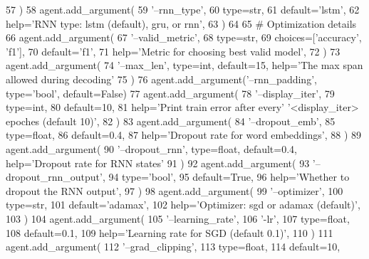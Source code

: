 \begin{DoxyCode}
57     )
58     agent.add\_argument(
59         \textcolor{stringliteral}{'--rnn\_type'},
60         type=str,
61         default=\textcolor{stringliteral}{'lstm'},
62         help=\textcolor{stringliteral}{'RNN type: lstm (default), gru, or rnn'},
63     )
64 
65     \textcolor{comment}{# Optimization details}
66     agent.add\_argument(
67         \textcolor{stringliteral}{'--valid\_metric'},
68         type=str,
69         choices=[\textcolor{stringliteral}{'accuracy'}, \textcolor{stringliteral}{'f1'}],
70         default=\textcolor{stringliteral}{'f1'},
71         help=\textcolor{stringliteral}{'Metric for choosing best valid model'},
72     )
73     agent.add\_argument(
74         \textcolor{stringliteral}{'--max\_len'}, type=int, default=15, help=\textcolor{stringliteral}{'The max span allowed during decoding'}
75     )
76     agent.add\_argument(\textcolor{stringliteral}{'--rnn\_padding'}, type=\textcolor{stringliteral}{'bool'}, default=\textcolor{keyword}{False})
77     agent.add\_argument(
78         \textcolor{stringliteral}{'--display\_iter'},
79         type=int,
80         default=10,
81         help=\textcolor{stringliteral}{'Print train error after every'} \textcolor{stringliteral}{'<display\_iter> epoches (default 10)'},
82     )
83     agent.add\_argument(
84         \textcolor{stringliteral}{'--dropout\_emb'},
85         type=float,
86         default=0.4,
87         help=\textcolor{stringliteral}{'Dropout rate for word embeddings'},
88     )
89     agent.add\_argument(
90         \textcolor{stringliteral}{'--dropout\_rnn'}, type=float, default=0.4, help=\textcolor{stringliteral}{'Dropout rate for RNN states'}
91     )
92     agent.add\_argument(
93         \textcolor{stringliteral}{'--dropout\_rnn\_output'},
94         type=\textcolor{stringliteral}{'bool'},
95         default=\textcolor{keyword}{True},
96         help=\textcolor{stringliteral}{'Whether to dropout the RNN output'},
97     )
98     agent.add\_argument(
99         \textcolor{stringliteral}{'--optimizer'},
100         type=str,
101         default=\textcolor{stringliteral}{'adamax'},
102         help=\textcolor{stringliteral}{'Optimizer: sgd or adamax (default)'},
103     )
104     agent.add\_argument(
105         \textcolor{stringliteral}{'--learning\_rate'},
106         \textcolor{stringliteral}{'-lr'},
107         type=float,
108         default=0.1,
109         help=\textcolor{stringliteral}{'Learning rate for SGD (default 0.1)'},
110     )
111     agent.add\_argument(
112         \textcolor{stringliteral}{'--grad\_clipping'},
113         type=float,
114         default=10,

\end{DoxyCode}
